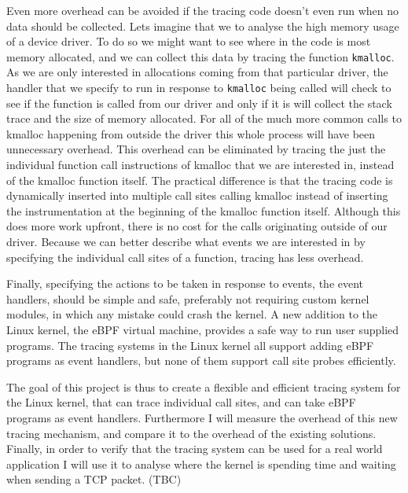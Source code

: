 \documentclass[12pt,twoside,notitlepage]{report}
\begin{document}
		Even more overhead can be avoided if the tracing code doesn't even run when no data should be collected. Lets imagine that we to analyse the high memory usage of a device driver. To do so we might want to see where in the code is most memory allocated, and we can collect this data by tracing the function \texttt{kmalloc}. As we are only interested in allocations coming from that particular driver, the handler that we specify to run in response to \texttt{kmalloc} being called will check to see if the function is called from our driver and only if it is will collect the stack trace and the size of memory allocated. For all of the much more common calls to kmalloc happening from outside the driver this whole process will have been unnecessary overhead. This overhead can be eliminated by tracing the just the individual function call instructions of kmalloc that we are interested in, instead of the kmalloc function itself. The practical difference is that the tracing code is dynamically inserted into multiple call sites calling kmalloc instead of inserting the instrumentation at the beginning of the kmalloc function itself. Although this does more work upfront, there is no cost for the calls originating outside of our driver. Because we can better describe what events we are interested in by specifying the individual call sites of a function, tracing has less overhead.

		Finally, specifying the actions to be taken in response to events, the event handlers, should be simple and safe, preferably not requiring custom kernel modules, in which any mistake could crash the kernel. A new addition to the Linux kernel, the eBPF virtual machine, provides a safe way to run user supplied programs. The tracing systems in the Linux kernel all support adding eBPF programs as event handlers, but none of them support call site probes efficiently.

		The goal of this project is thus to create a flexible and efficient tracing system for the Linux kernel, that can trace individual call sites, and can take eBPF programs as event handlers. Furthermore I will measure the overhead of this new tracing mechanism, and compare it to the overhead of the existing solutions. Finally, in order to verify that the tracing system can be used for a real world application I will use it to analyse where the kernel is spending time and waiting when sending a TCP packet. (TBC)

        
\end{document}
